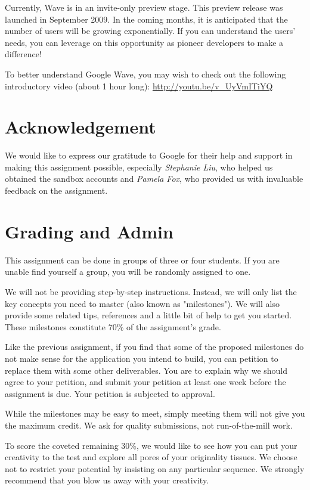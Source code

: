 Currently, Wave is in an invite-only preview stage. This preview
release was launched in September 2009. In the coming months, it is
anticipated that the number of users will be growing exponentially. If
you can understand the users' needs, you can leverage on this
opportunity as pioneer developers to make a difference!

To better understand Google Wave, you may wish to check out the
following introductory video (about 1 hour
long): \url{http://youtu.be/v_UyVmITiYQ}

\section{Acknowledgement}

We would like to express our gratitude to Google for their help and
support in making this assignment possible, especially {\em Stephanie
Liu}, who helped us obtained the sandbox accounts and {\em Pamela Fox},
who provided us with invaluable feedback on the assignment.

\section{Grading and Admin}

This assignment can be done in groups of three or four students.  If
you are unable find yourself a group, you will be randomly assigned to
one.

We will not be providing step-by-step instructions. Instead, we will
only list the key concepts you need to master (also known as
"milestones"). We will also provide some related tips, references and
a little bit of help to get you started. These milestones constitute
70\% of the assignment's grade.

Like the previous assignment, if you find that some of the proposed
milestones do not make sense for the application you intend to build,
you can petition to replace them with some other deliverables. You are
to explain why we should agree to your petition, and submit your
petition at least one week before the assignment is due. Your petition
is subjected to approval.

While the milestones may be easy to meet, simply meeting them will not
give you the maximum credit. We ask for quality submissions, not
run-of-the-mill work.

To score the coveted remaining 30\%, we would like to see how you can
put your creativity to the test and explore all pores of your
originality tissues. We choose not to restrict your potential by
insisting on any particular sequence. We strongly recommend that you
blow us away with your creativity.

